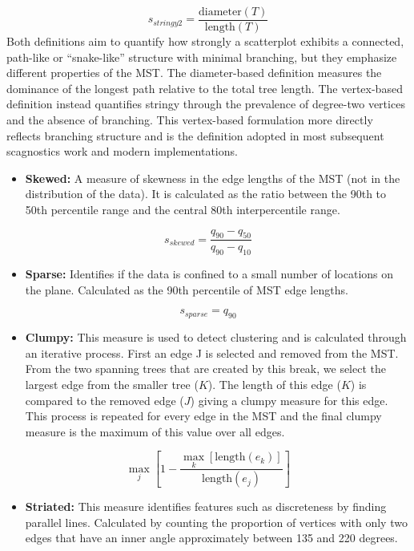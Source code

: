 \[ s_{stringy2} = \frac{\mbox{diameter}(T)}{\mbox{length}(T)}\]
Both definitions aim to quantify how strongly a scatterplot exhibits a connected, path-like or ``snake-like'' structure with minimal branching, but they emphasize different properties of the MST. The diameter-based definition measures the dominance of the longest path relative to the total tree length. The vertex-based definition instead quantifies stringy through the prevalence of degree-two vertices and the absence of branching. This vertex-based formulation more directly reflects branching structure and is the definition adopted in most subsequent scagnostics work and modern implementations.

\begin{itemize}
\tightlist
\item
  \textbf{Skewed:} A measure of skewness in the edge lengths of the MST (not in the distribution of the data). It is calculated as the ratio between the 90th to 50th percentile range and the central 80th interpercentile range.
\end{itemize}

\[s_{skewed} = \frac{q_{90}-{q_{50}}}{q_{90}-q_{10}}\]

\begin{itemize}
\tightlist
\item
  \textbf{Sparse:} Identifies if the data is confined to a small number of locations on the plane. Calculated as the 90th percentile of MST edge lengths.
\end{itemize}

\[s_{sparse}= q_{90}\]

\begin{itemize}
\tightlist
\item
  \textbf{Clumpy:} This measure is used to detect clustering and is calculated through an iterative process. First an edge J is selected and removed from the MST. From the two spanning trees that are created by this break, we select the largest edge from the smaller tree (\(K\)). The length of this edge (\(K\)) is compared to the removed edge (\(J\)) giving a clumpy measure for this edge. This process is repeated for every edge in the MST and the final clumpy measure is the maximum of this value over all edges.
\end{itemize}

\[\max_{j}\left[ 1-\frac{\max_{k}[\mbox{length}(e_k)]}{\mbox{length}(e_j)}\right]\]

\begin{itemize}
\tightlist
\item
  \textbf{Striated:} This measure identifies features such as discreteness by finding parallel lines. Calculated by counting the proportion of vertices with only two edges that have an inner angle approximately between 135 and 220 degrees.
\end{itemize}

